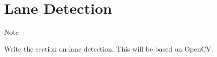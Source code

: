 \hypertarget{lane-detection}{%
\section{Lane Detection}\label{lane-detection}}

Note

Write the section on lane detection. This will be based on OpenCV.
